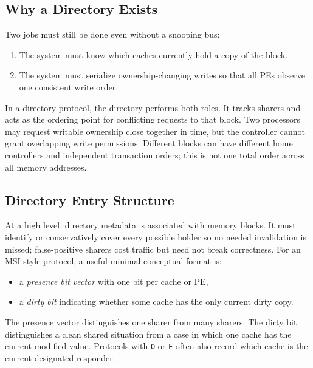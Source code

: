 \subsection*{Why a Directory Exists}
Two jobs must still be done even without a snooping bus:
\begin{enumerate}
    \item The system must know which caches currently hold a copy of the block.
    \item The system must serialize ownership-changing writes so that all PEs observe one consistent write order.
\end{enumerate}
In a directory protocol, the directory performs both roles.
It tracks sharers and acts as the ordering point for conflicting requests to that block.
Two processors may request writable ownership close together in time, but the controller cannot grant overlapping write permissions.
Different blocks can have different home controllers and independent transaction orders; this is not one total order across all memory addresses.

\subsection*{Directory Entry Structure}
At a high level, directory metadata is associated with memory blocks.
It must identify or conservatively cover every possible holder so no needed invalidation is missed; false-positive sharers cost traffic but need not break correctness.
For an MSI-style protocol, a useful minimal conceptual format is:
\begin{itemize}
    \item a \textit{presence bit vector} with one bit per cache or PE,
    \item a \textit{dirty bit} indicating whether some cache has the only current dirty copy.
\end{itemize}
The presence vector distinguishes one sharer from many sharers.
The dirty bit distinguishes a clean shared situation from a case in which one cache has the current modified value.
Protocols with \texttt{O} or \texttt{F} often also record which cache is the current designated responder.

